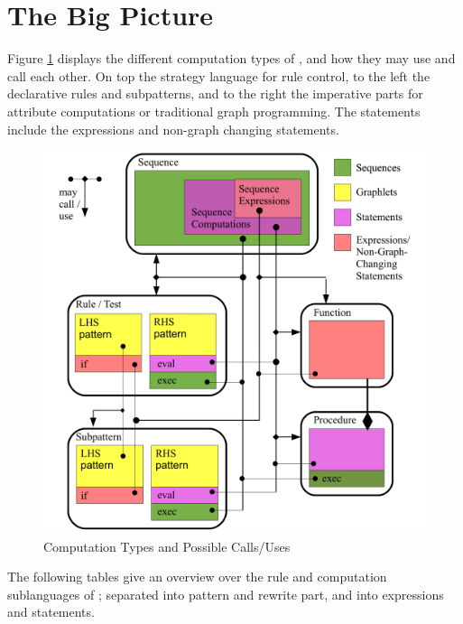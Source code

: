 \pagebreak

\section{The Big Picture}
Figure \ref{figcomptypescallsuses} displays the different computation types of \GrG, and how they may use and call each other. On top the strategy language for rule control, to the left the declarative rules and subpatterns, and to the right the imperative parts for attribute computations or traditional graph programming. The statements include the expressions and non-graph changing statements.

\begin{figure}[hptb]
  \centering
  \includegraphics[width=1.0\textwidth]{fig/ComputationContainmentAndCallability}
  \caption{Computation Types and Possible Calls/Uses}
  \label{figcomptypescallsuses}
\end{figure}

The following tables give an overview over the rule and computation sublanguages of \GrG;
separated into pattern and rewrite part, and into expressions and statements.

